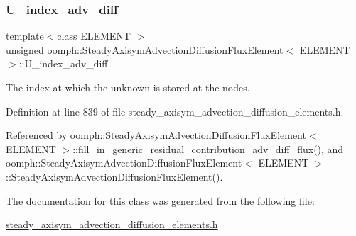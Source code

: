 \subsubsection{\texorpdfstring{U\+\_\+index\+\_\+adv\+\_\+diff}{U\_index\_adv\_diff}}
{\footnotesize\ttfamily template$<$class E\+L\+E\+M\+E\+NT $>$ \\
unsigned \hyperlink{classoomph_1_1SteadyAxisymAdvectionDiffusionFluxElement}{oomph\+::\+Steady\+Axisym\+Advection\+Diffusion\+Flux\+Element}$<$ E\+L\+E\+M\+E\+NT $>$\+::U\+\_\+index\+\_\+adv\+\_\+diff\hspace{0.3cm}{\ttfamily [private]}}



The index at which the unknown is stored at the nodes. 



Definition at line 839 of file steady\+\_\+axisym\+\_\+advection\+\_\+diffusion\+\_\+elements.\+h.



Referenced by oomph\+::\+Steady\+Axisym\+Advection\+Diffusion\+Flux\+Element$<$ E\+L\+E\+M\+E\+N\+T $>$\+::fill\+\_\+in\+\_\+generic\+\_\+residual\+\_\+contribution\+\_\+adv\+\_\+diff\+\_\+flux(), and oomph\+::\+Steady\+Axisym\+Advection\+Diffusion\+Flux\+Element$<$ E\+L\+E\+M\+E\+N\+T $>$\+::\+Steady\+Axisym\+Advection\+Diffusion\+Flux\+Element().



The documentation for this class was generated from the following file\+:\begin{DoxyCompactItemize}
\item 
\hyperlink{steady__axisym__advection__diffusion__elements_8h}{steady\+\_\+axisym\+\_\+advection\+\_\+diffusion\+\_\+elements.\+h}\end{DoxyCompactItemize}
